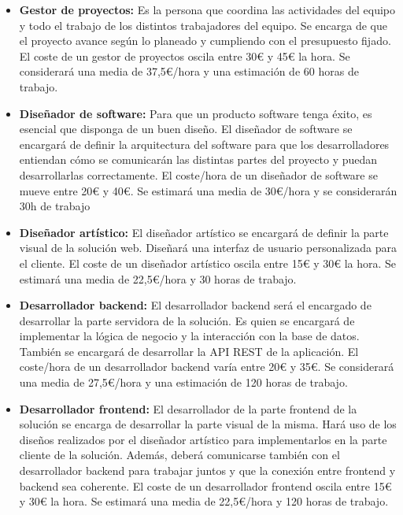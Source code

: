 \begin{itemize}
  \item \textbf{Gestor de proyectos:} Es la persona que coordina las actividades del equipo y todo el trabajo de los distintos trabajadores del equipo. Se encarga de que el proyecto avance según lo planeado y cumpliendo con el presupuesto fijado. El coste de un gestor de proyectos oscila entre 30€ y 45€ la hora. Se considerará una media de 37,5€/hora y una estimación de 60 horas de trabajo.
  \item  \textbf{Diseñador de software:} Para que un producto software tenga éxito, es esencial que disponga de un buen diseño. El diseñador de software se encargará de definir la arquitectura del software para que los desarrolladores entiendan cómo se comunicarán las distintas partes del proyecto y puedan desarrollarlas correctamente. El coste/hora de un diseñador de software se mueve entre 20€ y 40€. Se estimará una media de 30€/hora y se considerarán 30h de trabajo
  \item \textbf{Diseñador artístico:} El diseñador artístico se encargará de definir la parte visual de la solución web. Diseñará una interfaz de usuario personalizada para el cliente. El coste de un diseñador artístico oscila entre 15€ y 30€ la hora. Se estimará una media de 22,5€/hora y 30 horas de trabajo.
  \item \textbf{Desarrollador backend:} El desarrollador backend será el encargado de desarrollar la parte servidora de la solución. Es quien se encargará de implementar la lógica de negocio y la interacción con la base de datos. También se encargará de desarrollar la API REST de la aplicación. El coste/hora de un desarrollador backend varía entre 20€ y 35€. Se considerará una media de 27,5€/hora y una estimación de 120 horas de trabajo.
  \item \textbf{Desarrollador frontend:} El desarrollador de la parte frontend de la solución se encarga de desarrollar la parte visual de la misma. Hará uso de los diseños realizados por el diseñador artístico para implementarlos en la parte cliente de la solución. Además, deberá comunicarse también con el desarrollador backend para trabajar juntos y que la conexión entre frontend y backend sea coherente. El coste de un desarrollador frontend oscila entre 15€ y 30€ la hora. Se estimará una media de 22,5€/hora y 120 horas de trabajo.
\end{itemize}

